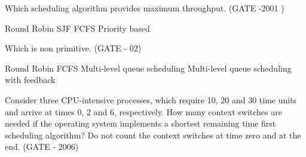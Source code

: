 
\begin{questyle}

  \question Which scheduling algorithm provides maximum throughput. (GATE -2001 )

  \begin{oneparchoices}
    \choice Round Robin
    \CorrectChoice SJF
    \choice FCFS
    \choice Priority based
  \end{oneparchoices}

  \end{questyle}





\begin{questyle}

  \question Which is non primitive. (GATE - 02)

  \begin{choices}
    \choice Round Robin
    \CorrectChoice FCFS
    \choice Multi-level queue scheduling
    \choice Multi-level queue scheduling with feedback
  \end{choices}

  \end{questyle}





\begin{questyle}

  \question Consider three CPU-intensive processes, which require 10, 20 and 30 time units and arrive at
            times 0, 2 and 6, respectively. How many context switches are needed if the operating system
            implements a shortest remaining time first scheduling algorithm? Do not count the context
            switches at time zero and at the end. (GATE - 2006)

  \begin{oneparchoices}
  \end{oneparchoices}

  \end{questyle}





